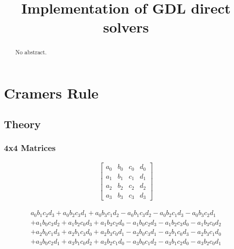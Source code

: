 \documentclass[]{scrartcl}
\title{Implementation of GDL direct solvers}
\begin{document}
\maketitle

\begin{abstract}
No abstract.
\end{abstract}

\section{Cramers Rule}
\subsection{Theory}
\subsubsection{4x4 Matrices}
\begin{align*}
\begin{bmatrix}
a_0&b_0&c_0&d_0\\
a_1&b_1&c_1&d_1\\
a_2&b_2&c_2&d_2\\
a_3&b_3&c_3&d_3
\end{bmatrix}
\end{align*}

\begin{comment}

\begin{align*}
  a_1b_2c_3d_4 
+ a_1b_3c_4d_2 
+ a_1b_4c_2d_3 
- a_1b_4c_3d_2
- a_1b_2c_4d_3\\
- a_1b_3c_2d_4
- a_2b_1c_3d_4
- a_4b_1c_2d_3
- a_3b_1c_4d_2
+ a_4b_1c_3d_2\\
+ a_2b_1c_4d_3
+ a_3b_1c_2d_4
+ a_2b_3c_1d_4
+ a_4b_2c_1d_3
+ a_3b_4c_1d_2\\
- a_4b_3c_1d_2
- a_2b_4c_1d_3
- a_3b_2c_1d_4
- a_2b_3c_4d_1
- a_4b_2c_3d_1\\
- a_3b_4c_2d_1
+ a_4b_3c_2d_1
+ a_2b_4c_3d_1
+ a_3b_2c_4d_1           
\end{align*}

\end{comment}


\begin{align*}
a_0b_1c_2d_3 
+ a_0b_2c_3d_1 
+ a_0b_3c_1d_2
- a_0b_1c_3d_2
- a_0b_2c_1d_3 
- a_0b_3c_2d_1\\
+ a_1b_0c_3d_2
+ a_1b_2c_0d_3
+ a_1b_3c_2d_0
- a_1b_0c_2d_3
- a_1b_2c_3d_0
- a_1b_3c_0d_2\\
+ a_2b_0c_1d_3
+ a_2b_1c_3d_0
+ a_2b_3c_0d_1
- a_2b_0c_3d_1
- a_2b_1c_0d_3
- a_2b_3c_1d_0\\
+ a_3b_0c_2d_1
+ a_3b_1c_0d_2
+ a_3b_2c_1d_0
- a_3b_0c_1d_2
- a_3b_1c_2d_0
- a_3b_2c_0d_1           
\end{align*}
\end{document}
